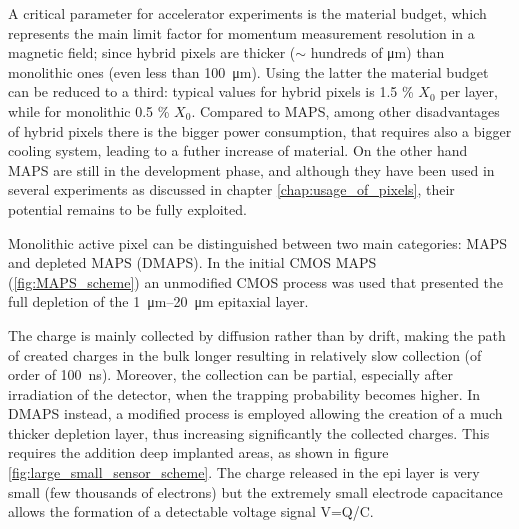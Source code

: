    A critical parameter for accelerator experiments is the material budget, which represents the main limit factor for momentum measurement resolution in a magnetic field; since hybrid pixels are thicker ($\sim$ hundreds of \si{\um}) than monolithic ones (even less than \SI{100}{\um}). Using the latter the material budget can be reduced to a third: typical values for hybrid pixels is 1.5 \% $X_0$ per layer, while for monolithic 0.5 \% $X_0$. Compared to MAPS, among other disadvantages of hybrid pixels there is the bigger power consumption, that requires also a bigger cooling system, leading to a futher increase of material.
   On the other hand MAPS are still in the development phase, and although they have been used in several experiments as discussed in chapter \ref{chap:usage_of_pixels}, their potential remains to be fully exploited.

   Monolithic active pixel can be distinguished between two main categories: MAPS and depleted MAPS (DMAPS).
   In the initial CMOS MAPS (\ref{fig:MAPS_scheme}) an unmodified CMOS process was used that presented the full depletion of the \SIrange{1}{20}{\um} epitaxial layer.

   The charge is mainly collected by diffusion rather than by drift, making the path of created charges in the bulk longer resulting in relatively slow collection (of order of \SI{100}{ns}). 
   Moreover, the collection can be partial, especially after irradiation of the detector, when the trapping probability becomes higher. 
   In DMAPS instead, a modified process is employed allowing the creation of a much thicker depletion layer, thus increasing significantly the collected charges. This requires the addition deep implanted areas, as shown in figure \ref{fig:large_small_sensor_scheme}. The charge released in the epi layer is very small (few thousands of electrons) but the extremely small electrode capacitance allows the formation of a detectable voltage signal V=Q/C.
   
